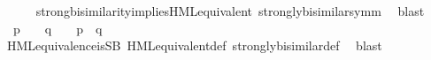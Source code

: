 \begin{isabellebody}
\ \ \ \ \isamarkupfalse%
\ strong{\isacharunderscore}{\kern0pt}bisimilarity{\isacharunderscore}{\kern0pt}implies{\isacharunderscore}{\kern0pt}HML{\isacharunderscore}{\kern0pt}equivalent\ strongly{\isacharunderscore}{\kern0pt}bisimilar{\isacharunderscore}{\kern0pt}symm\ \isamarkupfalse%
\ blast\isanewline
{}\isamarkupfalse%
\isanewline
\ \ \isamarkupfalse%
\ {\isacartoucheopen}{\isasymforall}{\isasymphi}{\isachardot}{\kern0pt}\ {\isacharparenleft}{\kern0pt}p\ {\isasymTurnstile}\ {\isasymphi}{\isacharparenright}{\kern0pt}\ {\isacharequal}{\kern0pt}\ {\isacharparenleft}{\kern0pt}q\ {\isasymTurnstile}\ {\isasymphi}{\isacharparenright}{\kern0pt}\ {\isasymLongrightarrow}\ p\ {\isasymleftrightarrow}\ q{\isacartoucheclose}\ \isanewline
\ \ \ \ \isamarkupfalse%
\ HML{\isacharunderscore}{\kern0pt}equivalence{\isacharunderscore}{\kern0pt}is{\isacharunderscore}{\kern0pt}SB\ HML{\isacharunderscore}{\kern0pt}equivalent{\isacharunderscore}{\kern0pt}def\ strongly{\isacharunderscore}{\kern0pt}bisimilar{\isacharunderscore}{\kern0pt}def\ \isamarkupfalse%
\ blast\isanewline
{}\isamarkupfalse%
%
\endisatagvisible
{\isafoldvisible}%
%
\isadelimvisible
\isanewline
%
\endisadelimvisible
\isanewline
\isanewline
{}\isamarkupfalse%
\ %
%
\isadelimtheory
%
\endisadelimtheory
%
\isatagtheory
%
\endisatagtheory
{\isafoldtheory}%
%
\isadelimtheory
%
\endisadelimtheory
%
\end{isabellebody}%
\endinput
